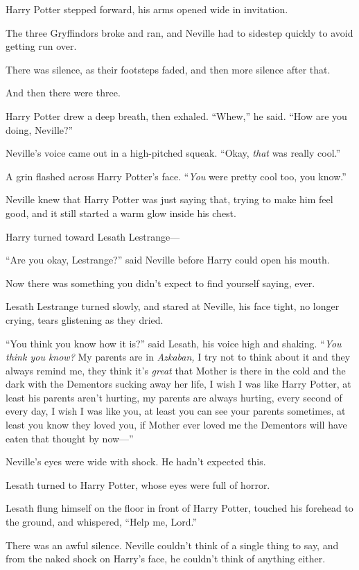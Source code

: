 Harry Potter stepped forward, his arms opened wide in invitation.

The three Gryffindors broke and ran, and Neville had to sidestep quickly to
avoid getting run over.

There was silence, as their footsteps faded, and then more silence after that.

And then there were three.

Harry Potter drew a deep breath, then exhaled. “Whew,” he said. “How are you
doing, Neville?”

Neville’s voice came out in a high-pitched squeak. “Okay, \emph{that} was
really cool.”

A grin flashed across Harry Potter’s face. “\emph{You} were pretty cool too,
you know.”

Neville knew that Harry Potter was just saying that, trying to make him feel
good, and it still started a warm glow inside his chest.

Harry turned toward Lesath Lestrange—

“Are you okay, Lestrange?” said Neville before Harry could open his mouth.

Now there was something you didn’t expect to find yourself saying, ever.

Lesath Lestrange turned slowly, and stared at Neville, his face tight, no
longer crying, tears glistening as they dried.

“You think you know how it is?” said Lesath, his voice high and shaking.
“\emph{You think you know?} My parents are in \emph{Azkaban,} I try not to
think about it and they always remind me, they think it’s \emph{great} that
Mother is there in the cold and the dark with the Dementors sucking away her
life, I wish I was like Harry Potter, at least his parents aren’t hurting, my
parents are always hurting, every second of every day, I wish I was like you,
at least you can see your parents sometimes, at least you know they loved you,
if Mother ever loved me the Dementors will have eaten that thought by now—”

Neville’s eyes were wide with shock. He hadn’t expected this.

Lesath turned to Harry Potter, whose eyes were full of horror.

Lesath flung himself on the floor in front of Harry Potter, touched his
forehead to the ground, and whispered, “Help me, Lord.”

There was an awful silence. Neville couldn’t think of a single thing to say,
and from the naked shock on Harry’s face, he couldn’t think of anything either.

